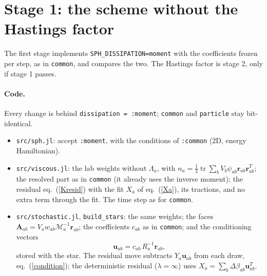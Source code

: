 \documentclass[11pt,aps,preprint,nofootinbib,superscriptaddress,tightenlines]{revtex4-2}
\def\st{\begin{equation}}
\def\stp{\end{equation}}
\def\Eq#1{eq.~(\ref{#1})}
\def\tr{\operatorname{tr}}
\let\oldparagraph\paragraph
\renewcommand{\paragraph}{\par\bigskip\oldparagraph}
\begin{document}
\section{Stage 1: the scheme without the Hastings factor}
\label{sec:stage1}

The first stage implements \texttt{SPH\_DISSIPATION=moment} with the coefficients frozen per step, as in \texttt{common}, and compares the two.
The Hastings factor is stage 2, only if stage 1 passes.

\paragraph{Code.}  Every change is behind \texttt{dissipation = :moment}; \texttt{common} and \texttt{particle} stay bit-identical.
\begin{itemize}
\item \texttt{src/sph.jl}: accept \texttt{:moment}, with the conditions of \texttt{:common} (2D, energy Hamiltonian).
\item \texttt{src/viscous.jl}: the lab weights without $\Lambda_a$, with $n_a=\frac12\tr\sum_bV_b\psi_{ab}\bm r_{ab}\bm r_{ab}^T$; the resolved part as in
  \texttt{common} (it already uses the inverse moment); the residual \Eq{Kresid} with the fit $X_a$ of \Eq{Xa}, its tractions, and no extra term
  through the fit.  The time step as for \texttt{common}.
\item \texttt{src/stochastic.jl}, \texttt{build\_stars}: the same weights; the faces $\bm A_{ab}=V_aw_{ab}\mathcal M_a^{-1}\bm r_{ab}$; the coefficients $c_{ab}$ as in \texttt{common};
  and the conditioning vectors
  \st
  \bm u_{ab}=c_{ab}\,R_a^{-1}\bm r_{ab} ,
  \stp
  stored with the star.  The residual move subtracts $Y_a\bm u_{ab}$ from each draw, \Eq{condition}; the deterministic residual ($\lambda=\infty$)
  uses $X_a=\sum_b\Delta\beta_{ab}\bm u_{ab}^T$.
\end{itemize}
\end{document}
